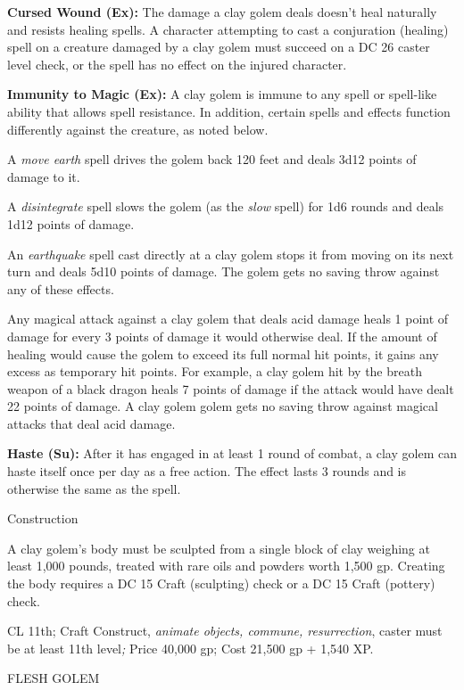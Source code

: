 \documentclass{article}
\begin{document}
\textbf{Cursed Wound (Ex): }The damage a clay golem deals doesn't heal naturally 
and resists healing spells. A character attempting to cast a conjuration (healing) 
spell on a creature damaged by a clay golem must succeed on a DC 26 caster level 
check, or the spell has no effect on the injured character.

\textbf{Immunity to Magic (Ex):} A clay golem is immune to any spell or spell-like 
ability that allows spell resistance. In addition, certain spells and effects function 
differently against the creature, as noted below.

A \textit{move earth }spell drives the golem back 120 feet and deals 3d12 points 
of damage to it.

A \textit{disintegrate }spell slows the golem (as the \textit{slow }spell) for 
1d6 rounds and deals 1d12 points of damage.

An \textit{earthquake }spell cast directly at a clay golem stops it from moving 
on its next turn and deals 5d10 points of damage. The golem gets no saving throw 
against any of these effects.

Any magical attack against a clay golem that deals acid damage heals 1 point of 
damage for every 3 points of damage it would otherwise deal. If the amount of healing 
would cause the golem to exceed its full normal hit points, it gains any excess 
as temporary hit points. For example, a clay golem hit by the breath weapon of 
a black dragon heals 7 points of damage if the attack would have dealt 22 points 
of damage. A clay golem golem gets no saving throw against magical attacks that 
deal acid damage.

\textbf{Haste (Su):} After it has engaged in at least 1 round of combat, a clay 
golem can haste itself once per day as a free action. The effect lasts 3 rounds 
and is otherwise the same as the spell. 

Construction

A clay golem's body must be sculpted from a single block of clay weighing at least 
1,000 pounds, treated with rare oils and powders worth 1,500 gp. Creating the body 
requires a DC 15 Craft (sculpting) check or a DC 15 Craft (pottery) check. 

CL 11th; Craft Construct, \textit{animate objects, commune, resurrection}, caster 
must be at least 11th level\textit{; }Price 40,000 gp; Cost 21,500 gp + 1,540 XP.

\vspace{12pt}
FLESH GOLEM
\end{document}
